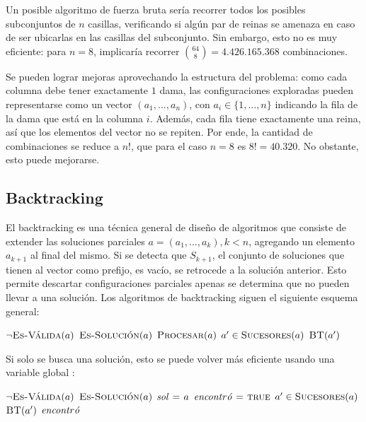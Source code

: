 \documentclass[a4paper]{report}
\begin{document}
Un posible algoritmo de fuerza bruta sería recorrer todos los posibles subconjuntos de $n$ casillas, verificando si algún par de reinas se amenaza en caso de ser ubicarlas en las casillas del subconjunto. Sin embargo, esto no es muy eficiente: para $n = 8$, implicaría recorrer $\binom{64}{8} = 4.426.165.368$ combinaciones.

Se pueden lograr mejoras aprovechando la estructura del problema: como cada columna debe tener exactamente $1$ dama, las configuraciones exploradas pueden representarse como un vector $(a_1, ..., a_n)$, con $a_i \in \{1, ..., n\}$ indicando la fila de la dama que está en la columna $i$. Además, cada fila tiene exactamente una reina, así que los elementos del vector no se repiten. Por ende, la cantidad de combinaciones se reduce a $n!$, que para el caso $n=8$ es $8! = 40.320$. No obstante, esto puede mejorarse.

\subsection{Backtracking}

El backtracking es una técnica general de diseño de algoritmos que consiste de extender las soluciones parciales $a = (a_1, ..., a_k), k < n$, agregando un elemento $a_{k+1}$ al final del mismo. Si se detecta que $S_{k+1}$, el conjunto de soluciones que tienen al vector como prefijo, es vacío, se retrocede a la solución anterior. Esto permite descartar configuraciones parciales apenas se determina que no pueden llevar a una solución. Los algoritmos de backtracking siguen el siguiente esquema general:
\begin{codebox}
    \li \If $\neg\textnormal{\scshape Es-Válida}(a)$ \Then
    \li \Return
    \End
    \li \If $\textnormal{\scshape Es-Solución}(a)$ \Then
    \li $\textnormal{\scshape Procesar}(a)$
    \li \Return
    \End
    \li \For $a' \in \textnormal{\scshape Sucesores}(a)$ \Do
    \li $\textnormal{\scshape BT}(a')$
    \End
\end{codebox}

Si solo se busca una solución, esto se puede volver más eficiente usando una variable global :
\begin{codebox}
    \li \If $\neg\textnormal{\scshape Es-Válida}(a)$ \Then
    \li \Return
    \End
    \li \If $\textnormal{\scshape Es-Solución}(a)$ \Then
    \li $\id{sol} \gets a$
    \li $\id{encontr\acute{o}} \gets \const{true}$
    \li \Return
    \End
    \li \For $a' \in \textnormal{\scshape Sucesores}(a)$ \Do
    \li $\textnormal{\scshape BT}(a')$
    \li \If $\id{encontr\acute{o}}$ \Then
    \li \Return
    \End
    \End
\end{codebox}
\end{document}
